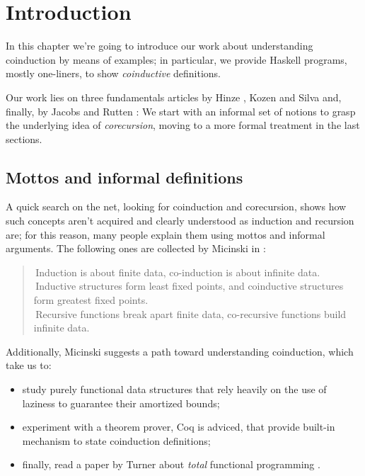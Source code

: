 
\chapter{Introduction}

In this chapter we're going to introduce our work about
understanding coinduction by means of examples; in particular,
we provide Haskell programs, mostly one-liners, to show 
\emph{coinductive} definitions. 

Our work lies on three fundamentals articles by Hinze \cite{Hinze},
Kozen and Silva \cite{Kozen:Silva} and, finally, by Jacobs and Rutten
\cite{jacobs:rutten}: We start with an informal set of notions to 
grasp the underlying idea of \emph{corecursion}, moving to a more 
formal treatment in the last sections. 

\section{Mottos and informal definitions}

A quick search on the net, looking for coinduction and corecursion, 
shows how such concepts aren't acquired and clearly understood as induction and
recursion are; for this reason, many people explain them using mottos 
and informal arguments. The following ones are collected by Micinski 
in \cite{micinski}:
\begin{quote}
    \guillemotleft\,Induction is about finite data, 
        co-induction is about infinite data.\guillemotright\\
    \guillemotleft\,Inductive structures form least fixed points, 
        and coinductive structures form greatest fixed points.\guillemotright\\
    \guillemotleft\,Recursive functions break apart finite data, 
        co-recursive functions build infinite data.\guillemotright
\end{quote}
Additionally, Micinski suggests a path toward understanding coinduction, which
take us to:
\begin{itemize}
    \item study purely functional data structures that rely heavily on the 
        use of laziness to guarantee their amortized bounds;
    \item experiment with a theorem prover, Coq is adviced, that provide
        built-in mechanism to state coinduction definitions;
    \item finally, read a paper by Turner about \emph{total} functional
        programming \cite{turner}.
\end{itemize}

